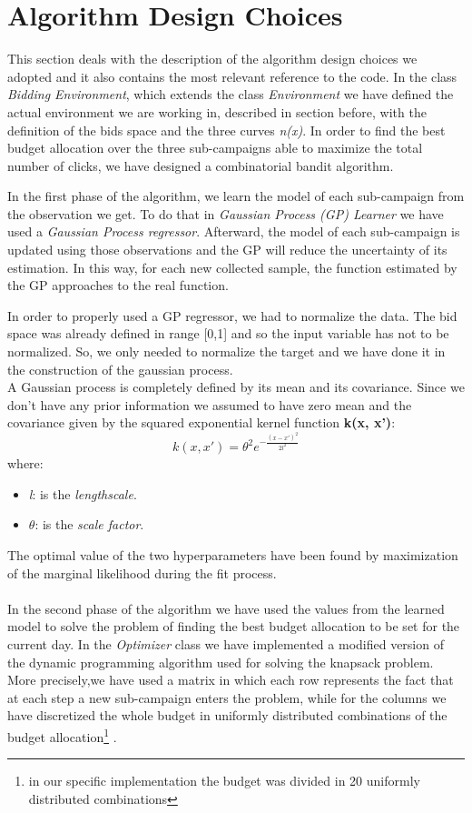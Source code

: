 \section{Algorithm Design Choices}

This section deals with the description of the algorithm design choices we adopted and
it also contains the most relevant reference to the code.
In the class \textit{Bidding Environment}, which extends the class \textit{Environment} we have defined the actual environment we are working in, described in section before, with the definition of the bids space and the three curves \textit{n(x)}.
In order to find the best budget allocation over the three sub-campaigns able to maximize the total number of clicks, we have designed a combinatorial bandit algorithm.

In the first phase of the algorithm, we learn the model of each sub-campaign from the observation we get.
To do that in \textit{Gaussian Process (GP) Learner} we have used a \textit{Gaussian Process regressor}.
Afterward, the model of each sub-campaign is updated using those observations and the GP will reduce the uncertainty of its estimation.
In this way, for each new collected sample, the function estimated by the GP approaches to the real function.


In order to properly used a GP regressor, we had to normalize the data. The bid space was already defined in range [0,1] and so the input variable has not to be normalized. So, we only needed to normalize the target and we have done it in the construction of the gaussian process.\\
A Gaussian process is completely defined by its mean and its covariance. Since we don't have any prior information we assumed to have zero mean and the covariance given by the squared exponential kernel function \textbf{k(x, x')}:
\begin{equation}
    k(x,x') = \theta^{2} e^{-\frac{(x-x')^2}{2 l^2}}
\end{equation}
where:
\begin{itemize}
    \item \textit{l}: is the \textit{lengthscale}.
    \item $\theta$: is the \textit{scale factor}.
\end{itemize}
The optimal value of the two hyperparameters have been found by maximization of the marginal likelihood during the fit process.
\\
\\
In the second phase of the algorithm we have used the values from the learned model to solve the problem of finding the best budget allocation to be set for the current day.
In the \textit{Optimizer} class we have implemented a modified version of the dynamic programming algorithm used for solving the knapsack problem.
More precisely,we have used a matrix in which each row represents the fact that at each step a new sub-campaign enters the problem, while for the columns we have discretized the whole budget in uniformly distributed combinations of the budget allocation\footnote{in our specific implementation the budget was divided in 20 uniformly distributed combinations} .


